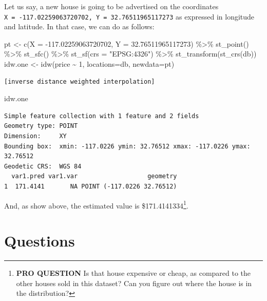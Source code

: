 \documentclass[
  letterpaper,
  DIV=11,
  numbers=noendperiod,
  oneside]{scrreprt}
\newenvironment{Shaded}{\begin{snugshade}}{\end{snugshade}}
\newcommand{\AttributeTok}[1]{\textcolor[rgb]{0.40,0.45,0.13}{#1}}
\newcommand{\DecValTok}[1]{\textcolor[rgb]{0.68,0.00,0.00}{#1}}
\newcommand{\FloatTok}[1]{\textcolor[rgb]{0.68,0.00,0.00}{#1}}
\newcommand{\FunctionTok}[1]{\textcolor[rgb]{0.28,0.35,0.67}{#1}}
\newcommand{\NormalTok}[1]{\textcolor[rgb]{0.00,0.23,0.31}{#1}}
\newcommand{\OtherTok}[1]{\textcolor[rgb]{0.00,0.23,0.31}{#1}}
\newcommand{\SpecialCharTok}[1]{\textcolor[rgb]{0.37,0.37,0.37}{#1}}
\newcommand{\StringTok}[1]{\textcolor[rgb]{0.13,0.47,0.30}{#1}}
\begin{document}
Let us say, a new house is going to be advertised on the coordinates
\texttt{X\ =\ -117.02259063720702,\ Y\ =\ 32.76511965117273} as
expressed in longitude and latitude. In that case, we can do as follows:

\begin{Shaded}
\begin{Highlighting}[]
\NormalTok{pt }\OtherTok{\textless{}{-}} \FunctionTok{c}\NormalTok{(}\AttributeTok{X =} \SpecialCharTok{{-}}\FloatTok{117.02259063720702}\NormalTok{, }\AttributeTok{Y =} \FloatTok{32.76511965117273}\NormalTok{) }\SpecialCharTok{\%\textgreater{}\%}
  \FunctionTok{st\_point}\NormalTok{() }\SpecialCharTok{\%\textgreater{}\%}
  \FunctionTok{st\_sfc}\NormalTok{() }\SpecialCharTok{\%\textgreater{}\%}
  \FunctionTok{st\_sf}\NormalTok{(}\AttributeTok{crs =} \StringTok{"EPSG:4326"}\NormalTok{) }\SpecialCharTok{\%\textgreater{}\%}
  \FunctionTok{st\_transform}\NormalTok{(}\FunctionTok{st\_crs}\NormalTok{(db))}
\NormalTok{idw.one }\OtherTok{\textless{}{-}} \FunctionTok{idw}\NormalTok{(price }\SpecialCharTok{\textasciitilde{}} \DecValTok{1}\NormalTok{, }\AttributeTok{locations=}\NormalTok{db, }\AttributeTok{newdata=}\NormalTok{pt)}
\end{Highlighting}
\end{Shaded}

\begin{verbatim}
[inverse distance weighted interpolation]
\end{verbatim}

\begin{Shaded}
\begin{Highlighting}[]
\NormalTok{idw.one}
\end{Highlighting}
\end{Shaded}

\begin{verbatim}
Simple feature collection with 1 feature and 2 fields
Geometry type: POINT
Dimension:     XY
Bounding box:  xmin: -117.0226 ymin: 32.76512 xmax: -117.0226 ymax: 32.76512
Geodetic CRS:  WGS 84
  var1.pred var1.var                   geometry
1  171.4141       NA POINT (-117.0226 32.76512)
\end{verbatim}

And, as show above, the estimated value is \$171.4141334\footnote{\textbf{PRO
  QUESTION} Is that house expensive or cheap, as compared to the other
  houses sold in this dataset? Can you figure out where the house is in
  the distribution?}.

\section{Questions}\label{questions}
\end{document}
